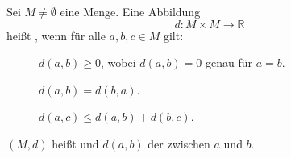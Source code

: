 Sei $M \neq \emptyset$ eine Menge. Eine Abbildung 
$$d: M \times M \to \mathbb{R}$$
heißt , wenn für alle $a, b, c \in M$ gilt:
\begin{description}
    \item[] $d(a, b) \geq 0$, wobei $d(a, b) = 0$ genau für $a=b$.
    \item[] $d(a, b) = d(b, a)$.
    \item[] $d(a, c) \leq d(a, b) + d(b, c)$.
\end{description}
$(M, d)$ heißt  und $d(a, b)$ der  zwischen $a$ und $b$.